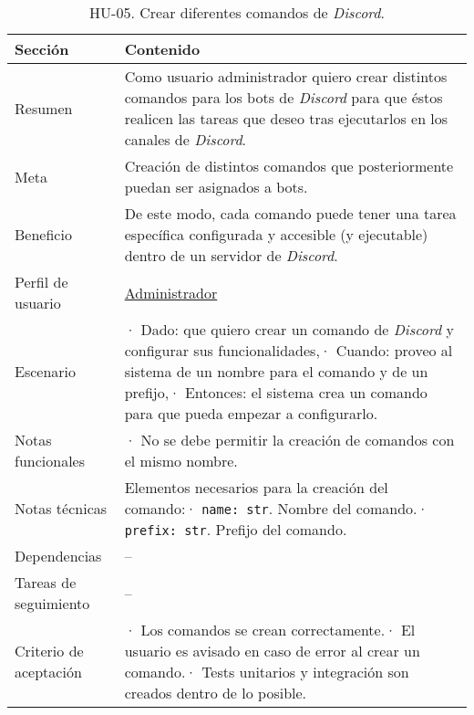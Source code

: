 \begin{table}[H]
    \centering
    \def\arraystretch{1.25}
    \begin{adjustbox}{max width=\textwidth}
    \begin{tabularx}{\textwidth}{|l|L|}
    \hline
        \textbf{Sección} & \textbf{Contenido} \\ \hline
    \hline
        Resumen & Como usuario administrador quiero crear distintos comandos para los bots de \textit{Discord} para que éstos realicen las tareas que deseo tras ejecutarlos en los canales de \textit{Discord}. \\ \hline
        Meta & Creación de distintos comandos que posteriormente puedan ser asignados a bots. \\ \hline
        Beneficio & De este modo, cada comando puede tener una tarea específica configurada y accesible (y ejecutable) dentro de un servidor de \textit{Discord}. \\ \hline
        Perfil de usuario & \hyperref[sec:personaAdmin]{Administrador} \\ \hline
        Escenario & · Dado: que quiero crear un comando de \textit{Discord} y configurar sus funcionalidades,\linebreak · Cuando: proveo al sistema de un nombre para el comando y de un prefijo,\linebreak · Entonces: el sistema crea un comando para que pueda empezar a configurarlo. \\ \hline
        Notas funcionales & · No se debe permitir la creación de comandos con el mismo nombre. \\ \hline
        Notas técnicas & Elementos necesarios para la creación del comando:\linebreak · \verb|name: str|. Nombre del comando.\linebreak · \verb|prefix: str|. Prefijo del comando. \\ \hline
        Dependencias & – \\ \hline
        Tareas de seguimiento & – \\ \hline
        Criterio de aceptación & · Los comandos se crean correctamente.\linebreak · El usuario es avisado en caso de error al crear un comando.\linebreak · Tests unitarios y integración son creados dentro de lo posible. \\ \hline
    \end{tabularx}
    \end{adjustbox}
    \caption{HU-05. Crear diferentes comandos de \textit{Discord}.}
\end{table}

